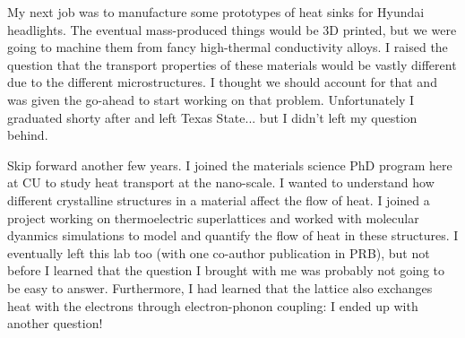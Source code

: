 \documentclass[prb,aps,11pt,superscriptaddress,floatfix]{revtex4-2}
\begin{document}
My next job was to manufacture some prototypes of heat sinks for Hyundai headlights. The eventual mass-produced things would be 3D printed, but we were going to machine them from fancy high-thermal conductivity alloys. I raised the question that the transport properties of these materials would be vastly different due to the different microstructures. I thought we should account for that and was given the go-ahead to start working on that problem. Unfortunately I graduated shorty after and left Texas State... but I didn't left my question behind. 

Skip forward another few years. I joined the materials science PhD program here at CU to study heat transport at the nano-scale. I wanted to understand how different crystalline structures in a material affect the flow of heat. I joined a project working on thermoelectric superlattices and worked with molecular dyanmics simulations to model and quantify the flow of heat in these structures. I eventually left this lab too (with one co-author publication in PRB), but not before I learned that the question I brought with me was probably not going to be easy to answer. Furthermore, I had learned that the lattice also exchanges heat with the electrons through electron-phonon coupling: I ended up with another question!
\end{document}
